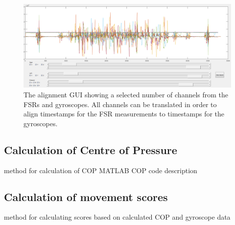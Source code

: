 \begin{figure}[H]
	\includegraphics[width=.6\textwidth]{figures/alignGUI}
	\caption{The alignment GUI showing a selected number of channels from the FSRs and gyroscopes. All channels can be translated in order to align timestamps for the FSR measurements to timestamps for the gyroscopes.}
	\label{fig:alignGUI}  %
\end{figure}


\subsection{Calculation of Centre of Pressure}
method for calculation of COP 
MATLAB COP code description

\subsection{Calculation of movement scores}
method for calculating scores based on calculated COP and gyroscope data

